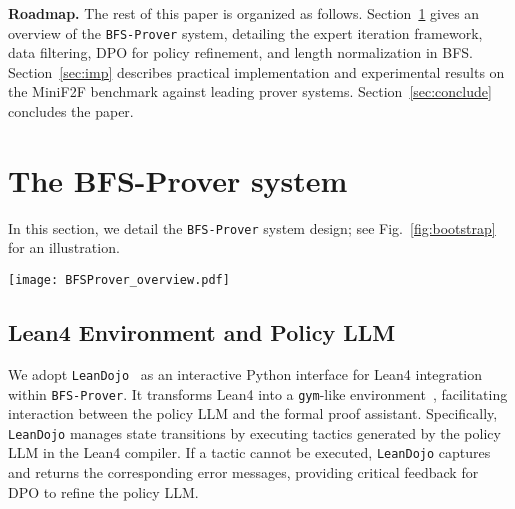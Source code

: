 \documentclass[10pt,english]{article}
\begin{document}
\textbf{Roadmap.} The rest of this paper is organized as follows. Section~\ref{sec:prover system} gives an overview of the \texttt{BFS-Prover} system, detailing the expert iteration framework, data filtering, DPO for policy refinement, and length normalization in BFS. Section~\ref{sec:imp} describes practical implementation and experimental results on the MiniF2F benchmark against leading prover systems. Section~\ref{sec:conclude} concludes the paper.



\section{The BFS-Prover system}\label{sec:prover system}
In this section, we detail the \texttt{BFS-Prover} system design; see Fig.~\ref{fig:bootstrap} for an illustration.
\begin{figure*}[htbp]
    \centering
    \texttt{[image: BFSProver\_overview.pdf]}
    \caption{An overview of \texttt{BFS-Prover}. The figure illustrates two key components: a) Best-First Tree Search (BFS) mechanism for automatic theorem proving, showing how the system explores proof paths by expanding nodes based on accumulated probabilities, with different node types (proof finish, error, intermediate, and unexplored) represented via color coding. The identified proof path demonstrates a successful state-tactic sequence. b) The training data accumulation process, depicting how the system leverages both successful proofs for Supervised Fine-Tuning (SFT) and compiler error feedback for Direct Preference Optimization (DPO). The system integrates \texttt{LeanDojo} as a python interface for Lean4 and employs a language model as the policy network for tactic generation.}
    \label{fig:bootstrap}
\end{figure*}

\subsection{Lean4 Environment and Policy LLM}
We adopt \texttt{LeanDojo}~\citep{yang2024leandojo} as an interactive Python interface for Lean4 integration within \texttt{BFS-Prover}. It transforms Lean4 into a \texttt{gym}-like environment~\citep{gym}, facilitating interaction between the policy LLM and the formal proof assistant. Specifically, \texttt{LeanDojo} manages state transitions by executing tactics generated by the policy LLM in the Lean4 compiler. If a tactic cannot be executed, \texttt{LeanDojo} captures and returns the corresponding error messages, providing critical feedback for DPO to refine the policy LLM.
\end{document}
